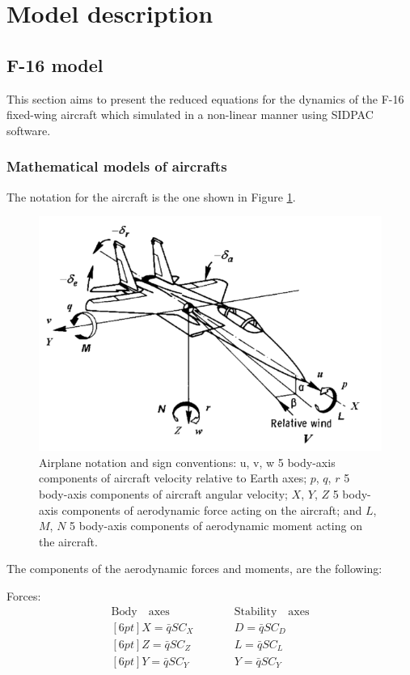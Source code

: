 \section{Model description}

\subsection{F-16 model}

  This section aims to present the reduced equations for the dynamics of the F-16 fixed-wing aircraft which simulated in a non-linear manner using SIDPAC software.

  \subsubsection{Mathematical models of aircrafts}

  The notation for the aircraft is the one shown in Figure \ref{fig:aircraftNotation}.

  \begin{figure}[!htpb]
    \centering
    \includegraphics[width=0.7 \textwidth]{figures/aircraftNotation}
    \caption[Airplane notation and sign conventions]{Airplane notation and sign conventions: u, v, w 5 body-axis components of aircraft velocity relative to Earth axes; $p$, $q$, $r$ 5 body-axis components of aircraft angular velocity; $X$, $Y$, $Z$ 5 body-axis components of aerodynamic force acting on the aircraft; and $L$, $M$, $N$ 5 body-axis components of aerodynamic moment acting on the aircraft.}
    \label{fig:aircraftNotation}
  \end{figure}

  The components of the aerodynamic forces and moments, are the following:

  \noindent
  Forces:
  \begin{eqnarray}
  \mathrm{Body \quad axes} \qquad && \mathrm{Stability \quad axes} \\ [6pt]
  X = \bar{q}SC_X \qquad && D = \bar{q}SC_D \\ [6pt]
  Z = \bar{q}SC_Z \qquad && L = \bar{q}SC_L \\ [6pt]
  Y = \bar{q}SC_Y \qquad && Y = \bar{q}SC_Y
  \end{eqnarray} 

